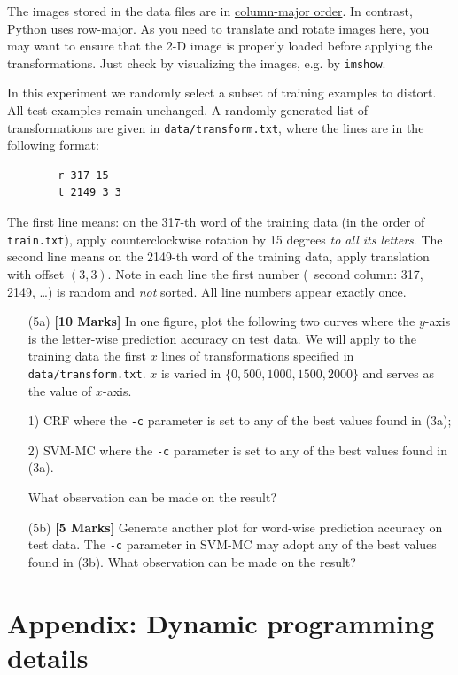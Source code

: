 \documentclass[11pt]{report}
\begin{document}
	The images stored in the data files are in \href{https://en.wikipedia.org/wiki/Row-_and_column-major_order}{column-major order}.
	In contrast, Python uses row-major.
	As you need to translate and rotate images here, 
	you may want to ensure that the 2-D image is properly loaded before applying the transformations.  
	Just check by visualizing the images, e.g. by \verb#imshow#.	
	
	In this experiment
	we randomly select a subset of training examples to distort.
	All test examples remain unchanged.
	A randomly generated list of transformations are given in \verb#data/transform.txt#, where the lines are in the following format:
	\begin{verbatim}
		r 317 15
		t 2149 3 3
	\end{verbatim}
	The first line means: on the 317-th word of the training data (in the order of \verb#train.txt#),
	apply counterclockwise rotation by 15 degrees \emph{to all its letters}.
	The second line means on the 2149-th word of the training data, apply translation with offset $(3,3)$.
	Note in each line the first number (\ie\ second column: 317, 2149, \ldots) is random and \emph{not} sorted.
	All line numbers appear exactly once.
	
	\begin{itemize}
		\item[(5a)] {\bf [10 Marks]} In one figure, plot the following two curves where the $y$-axis is the letter-wise prediction accuracy on test data.  We will apply to the training data the first $x$ lines of transformations specified in \verb#data/transform.txt#.  $x$ is varied in $\{0, 500, 1000, 1500, 2000\}$ and serves as the value of $x$-axis.
		
		1) CRF where the \verb#-c# parameter is set to any of the best values found in (3a);
		
		2) SVM-MC where the \verb#-c# parameter is set to any of the best values found in (3a).
		
		What observation can be made on the result?
		
		\item[(5b)] {\bf [5 Marks]}  Generate another plot for word-wise prediction accuracy on test data.  The \verb#-c# parameter in SVM-MC may adopt any of the best values found in (3b).
		What observation can be made on the result?
		
	\end{itemize}
	
	\newpage
	\section{Appendix: Dynamic programming details}
	
\end{document}
